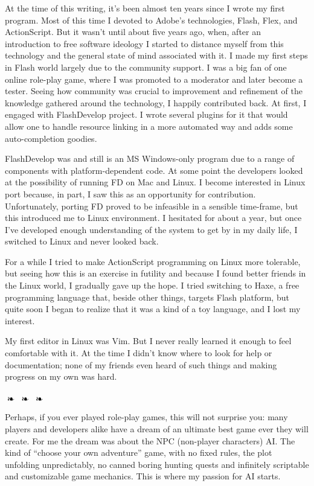 \documentclass[oneside]{memoir}
\begin{document}
At the time of this writing, it's been almost ten years since I wrote my first
program.  Most of this time I devoted to Adobe's technologies, Flash, Flex,
and ActionScript.  But it wasn't until about five years ago, when, after an
introduction to free software ideology I started to distance myself from this
technology and the general state of mind associated with it.  I made my first
steps in Flash world largely due to the community support.  I was a big fan of
one online role-play game, where I was promoted to a moderator and later
become a tester.  Seeing how community was crucial to improvement and
refinement of the knowledge gathered around the technology, I happily
contributed back.  At first, I engaged with FlashDevelop project.  I wrote
several plugins for it that would allow one to handle resource linking in a
more automated way and adds some auto-completion goodies.

FlashDevelop was and still is an MS Windows-only program due to a range of
components with platform-dependent code.  At some point the developers looked
at the possibility of running FD on Mac and Linux.  I become interested in
Linux port because, in part, I saw this as an opportunity for contribution.
Unfortunately, porting FD proved to be infeasible in a sensible time-frame,
but this introduced me to Linux environment.  I hesitated for about a year,
but once I've developed enough understanding of the system to get by in my
daily life, I switched to Linux and never looked back.

For a while I tried to make ActionScript programming on Linux more tolerable,
but seeing how this is an exercise in futility and because I found better
friends in the Linux world, I gradually gave up the hope.  I tried switching
to Haxe, a free programming language that, beside other things, targets Flash
platform, but quite soon I began to realize that it was a kind of a toy
language, and I lost my interest.

My first editor in Linux was Vim.  But I never really learned it enough to
feel comfortable with it.  At the time I didn't know where to look for help or
documentation; none of my friends even heard of such things and making
progress on my own was hard.

\noindent\hrulefill\hspace{0.2cm}
$\mathrel{
  \raisebox{-2pt}{
    \ding{167} \;
    \ding{167} \;
    \ding{167}}}$
\hspace{0.2cm} \hrulefill

Perhaps, if you ever played role-play games, this will not surprise you: many
players and developers alike have a dream of an ultimate best game ever they
will create.  For me the dream was about the NPC (non-player characters) AI.
The kind of ``choose your own adventure'' game, with no fixed rules, the plot
unfolding unpredictably, no canned boring hunting quests and infinitely
scriptable and customizable game mechanics.  This is where my passion for AI
starts.
\end{document}
